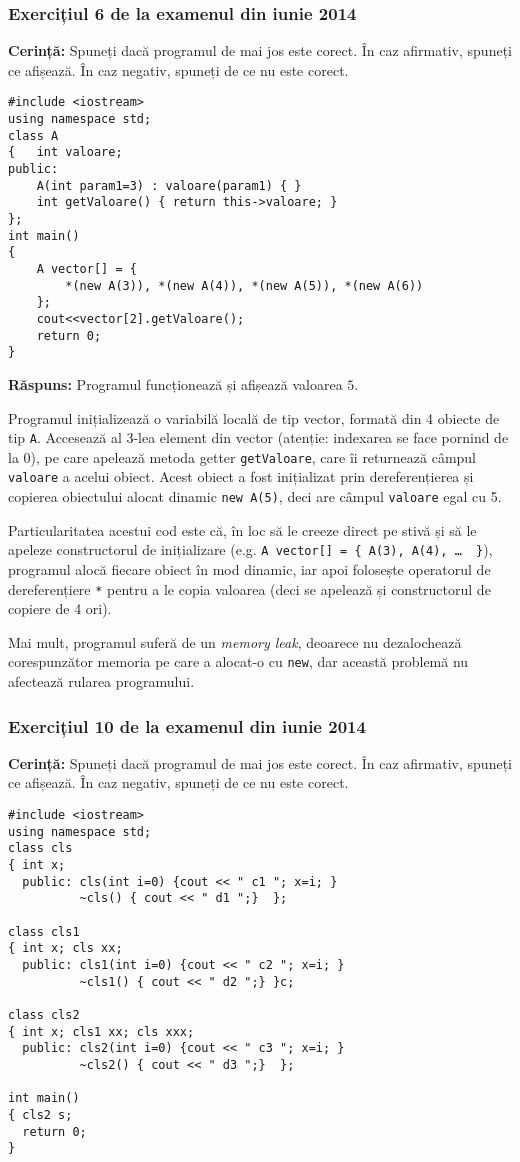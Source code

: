 \subsubsection*{Exercițiul 6 de la examenul din iunie 2014}

\textbf{Cerință:} Spuneți dacă programul de mai jos este corect. În caz afirmativ, spuneți ce afișează. În caz negativ, spuneți de ce nu este corect.
\begin{lstlisting}
#include <iostream>
using namespace std;
class A
{   int valoare;
public:
    A(int param1=3) : valoare(param1) { }
    int getValoare() { return this->valoare; }
};
int main()
{
    A vector[] = {
        *(new A(3)), *(new A(4)), *(new A(5)), *(new A(6))
    };
    cout<<vector[2].getValoare();
    return 0;
}
\end{lstlisting}

\textbf{Răspuns:} Programul funcționează și afișează valoarea \(5\).

Programul inițializează o variabilă locală de tip vector, formată din 4 obiecte de tip \texttt{A}. Accesează al 3-lea element din vector (atenție: indexarea se face pornind de la 0), pe care apelează metoda getter \texttt{getValoare}, care îi returnează câmpul \texttt{valoare} a acelui obiect. Acest obiect a fost inițializat prin dereferențierea și copierea obiectului alocat dinamic \texttt{new A(5)}, deci are câmpul \texttt{valoare} egal cu 5.

Particularitatea acestui cod este că, în loc să le creeze direct pe stivă și să le apeleze constructorul de inițializare (e.g. \texttt{A vector[] = \{ A(3), A(4), \dots \, \}}), programul alocă fiecare obiect în mod dinamic, iar apoi folosește operatorul de dereferențiere \texttt{*} pentru a le copia valoarea (deci se apelează și constructorul de copiere de 4 ori).

Mai mult, programul suferă de un \textit{memory leak}, deoarece nu dezalochează corespunzător memoria pe care a alocat-o cu \texttt{new}, dar această problemă nu afectează rularea programului.

\subsubsection*{Exercițiul 10 de la examenul din iunie 2014}

\textbf{Cerință:} Spuneți dacă programul de mai jos este corect. În caz afirmativ, spuneți ce afișează. În caz negativ, spuneți de ce nu este corect.
\begin{lstlisting}
#include <iostream>
using namespace std;
class cls
{ int x;
  public: cls(int i=0) {cout << " c1 "; x=i; }
          ~cls() { cout << " d1 ";}  };

class cls1
{ int x; cls xx;
  public: cls1(int i=0) {cout << " c2 "; x=i; }
          ~cls1() { cout << " d2 ";} }c;

class cls2
{ int x; cls1 xx; cls xxx;
  public: cls2(int i=0) {cout << " c3 "; x=i; }
          ~cls2() { cout << " d3 ";}  };

int main()
{ cls2 s;
  return 0;
}
\end{lstlisting}

